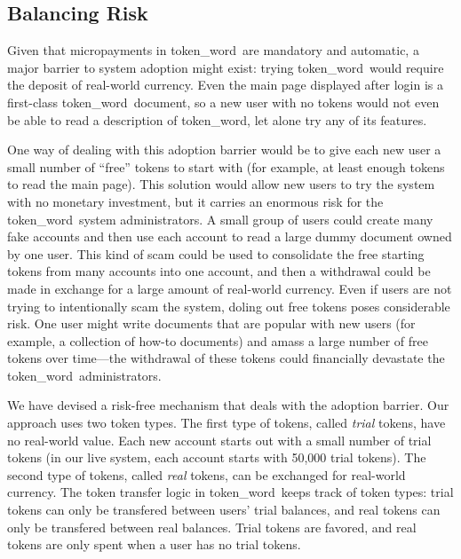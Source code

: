 \documentclass{acm_proc_article-sp}
\newcommand{\tokenWord}{token\_word}
\begin{document}
\subsection{Balancing Risk}
Given that micropayments in \tokenWord \  are mandatory and automatic, a major barrier to system adoption might exist:  trying \tokenWord \  would require the deposit of real-world currency.
Even the main page displayed after login is a first-class \tokenWord \  document, so a new user with no tokens would not even be able to read a description of \tokenWord, let alone try any of its features.

One way of dealing with this adoption barrier would be to give each new user a small number of ``free'' tokens to start with (for example, at least enough tokens to read the main page).
This solution would allow new users to try the system with no monetary investment, but it carries an enormous risk for the \tokenWord \  system administrators.
A small group of users could create many fake accounts and then use each account to read a large dummy document owned by one user.
This kind of scam could be used to consolidate the free starting tokens from many accounts into one account, and then a withdrawal could be made in exchange for a large amount of real-world currency.
Even if users are not trying to intentionally scam the system, doling out free tokens poses considerable risk.
One user might write documents that are popular with new users (for example, a collection of how-to documents) and amass a large number of free tokens over time---the withdrawal of these tokens could financially devastate the \tokenWord \  administrators.

We have devised a risk-free mechanism that deals with the adoption barrier.  
Our approach uses two token types.
The first type of tokens, called \textit{trial} tokens, have no real-world value.
Each new account starts out with a small number of trial tokens (in our live system, each account starts with 50,000 trial tokens).
The second type of tokens, called \textit{real} tokens, can be exchanged for real-world currency.
The token transfer logic in \tokenWord \  keeps track of token types:  trial tokens can only be transfered between users' trial balances, and real tokens can only be transfered between real balances.
Trial tokens are favored, and real tokens are only spent when a user has no trial tokens.
\end{document}
